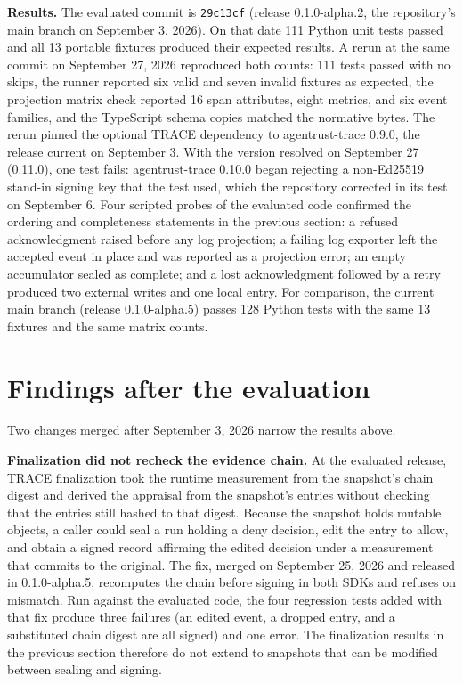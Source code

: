 \documentclass[10pt,letterpaper]{article}
\begin{document}
\textbf{Results.} The evaluated commit is \texttt{29c13cf} (release 0.1.0-alpha.2, the repository's main branch on September 3, 2026). On that date 111 Python unit tests passed and all 13 portable fixtures produced their expected results. A rerun at the same commit on September 27, 2026 reproduced both counts: 111 tests passed with no skips, the runner reported six valid and seven invalid fixtures as expected, the projection matrix check reported 16 span attributes, eight metrics, and six event families, and the TypeScript schema copies matched the normative bytes. The rerun pinned the optional TRACE dependency to agentrust-trace 0.9.0, the release current on September 3. With the version resolved on September 27 (0.11.0), one test fails: agentrust-trace 0.10.0 began rejecting a non-Ed25519 stand-in signing key that the test used, which the repository corrected in its test on September 6. Four scripted probes of the evaluated code confirmed the ordering and completeness statements in the previous section: a refused acknowledgment raised before any log projection; a failing log exporter left the accepted event in place and was reported as a projection error; an empty accumulator sealed as complete; and a lost acknowledgment followed by a retry produced two external writes and one local entry. For comparison, the current main branch (release 0.1.0-alpha.5) passes 128 Python tests with the same 13 fixtures and the same matrix counts.

\section{Findings after the evaluation}
\label{sec:after}

Two changes merged after September 3, 2026 narrow the results above.

\textbf{Finalization did not recheck the evidence chain.} At the evaluated release, TRACE finalization took the runtime measurement from the snapshot's chain digest and derived the appraisal from the snapshot's entries without checking that the entries still hashed to that digest. Because the snapshot holds mutable objects, a caller could seal a run holding a deny decision, edit the entry to allow, and obtain a signed record affirming the edited decision under a measurement that commits to the original. The fix, merged on September 25, 2026 and released in 0.1.0-alpha.5, recomputes the chain before signing in both SDKs and refuses on mismatch. Run against the evaluated code, the four regression tests added with that fix produce three failures (an edited event, a dropped entry, and a substituted chain digest are all signed) and one error. The finalization results in the previous section therefore do not extend to snapshots that can be modified between sealing and signing.
\end{document}
